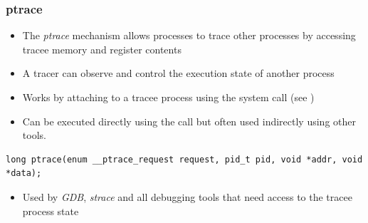 \begin{frame}[fragile]
  \frametitle{ptrace}
  \begin{itemize}
    \item The {\em ptrace} mechanism allows processes to trace other processes by
          accessing tracee memory and register contents
    \item A tracer can observe and control the execution state of another
          process
    \item Works by attaching to a tracee process using the 
          system call (see )
    \item Can be executed directly using the  call but often used
          indirectly using other tools.
  \end{itemize}

  \begin{block}{}
    \begin{verbatim}
long ptrace(enum __ptrace_request request, pid_t pid, void *addr, void *data);
    \end{verbatim}
  \end{block}

  \begin{itemize}
    \item Used by {\em GDB}, {\em strace} and all debugging tools that need access to the
          tracee process state
  \end{itemize}
\end{frame}
